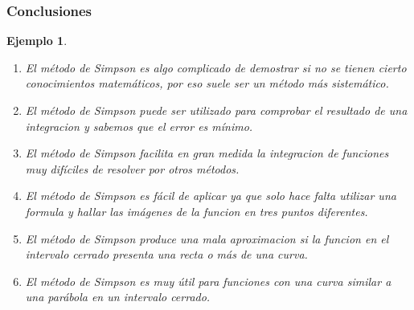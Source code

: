 \documentclass{beamer}
\newtheorem{ejemplo}{Ejemplo}
\begin{document}
\begin{frame}
\frametitle{Conclusiones}

\begin{ejemplo}
  \begin{enumerate}
    \item
      El método de Simpson es algo complicado de demostrar si no se tienen cierto conocimientos matemáticos, por eso suele ser un método más sistemático.
      \pause
    \item
      El método de Simpson puede ser utilizado para comprobar el resultado de una integracion y sabemos que el error es mínimo.
      \pause
    \item
      El método de Simpson facilita en gran medida la integracion de funciones muy difíciles de resolver por otros métodos.
      \pause
    \item
      El método de Simpson es fácil de aplicar ya que solo hace falta utilizar una formula y hallar las imágenes de la funcion en tres puntos diferentes.
      \pause
    \item El método de Simpson produce una mala aproximacion si la funcion en el intervalo cerrado presenta una recta o más de una curva.
      \pause
    \item El método de Simpson es muy útil para funciones con una curva similar a una parábola en un intervalo cerrado.    
      
  \end{enumerate}
\end{ejemplo}

\end{frame}
\end{document}

